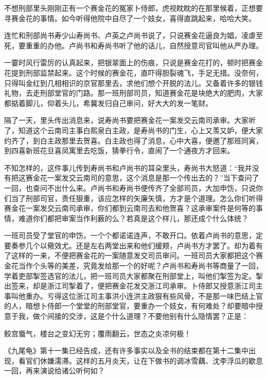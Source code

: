 \documentclass[12pt,UTF8]{ctexbook}
\begin{document}
{{{不想刑部里头刚刚正有一个赛金花的冤家卜侍郎，虎视眈眈的在那里候着，正想要寻赛金花的事情。如今听得他院中自尽了一个妓女，喜得直跳起来，哈哈大笑。

连忙和刑部尚书寿少山寿尚书、卢英之卢尚书说了，只说赛金花逼良为娼，凌虐至死，要重重的办他。卢尚书和寿尚书听了他的话儿，自然授意司官叫他从严办理。

一霎时风行雷厉的认真起来，把银翠面上的伤痕，只说是赛金花打的，顿时把赛金花提到刑部监禁起来。这个时候的赛金花，直吓得胆裂魂飞，手足无措。没奈何，只得叫金红到几相相识的京官那里去，求他们想个开脱的法儿。又备着许多的银钱礼物，去走刑部堂官的门路。那一班刑部司员，知道赛金花是块绝大的肥肉，大家都掂着脚儿，仰着头儿，希冀发归自己审问，好大大的发一笔财。

隔了一天，里头传出消息来，说寿尚书要把赛金花一案发交云南司承审。大家听了，知道这个云南司主事白熙泉白主政，是寿尚书的门生，心上又羡又妒，便大家约齐了，到白主政那里去贺喜。白主政也得了消息，心中大喜，便邀了那班同寅，到四喜新班花旦喜凤寓里去吃饭，猜拳行令，直闹了一个通夜方才回来。

不知怎样的，这件事儿传到寿尚书和卢尚书的耳朵里头，寿尚书大怒道：“我并没有把这赛金花一案发交云南司的意思，这个消息是那一个传出去的？”当下查问了一回，也查问不出什么来。卢尚书和寿尚书便传齐了全部司员，大加申饬，只说你们当了刑部司官，责任狠重，该应怎样的矢廉矢慎，方才是个道理。怎么你们听得赛金花一案发交云南司承审，你们都到云南司去和他贺喜？这承审案件是何等的事情，难道你们都把审案当作利薮的么？若真是这个样儿，那还成个什么体统？

一班司员受了堂官的申饬，一个个都诺诺连声，不敢开口。依着卢尚书的意思，定要奏参几个以儆效尤。还是左右两堂出来和他们缓颊，卢尚书方才罢了。却为着有了这样的一来，不便把赛金花的一案随意发交司员审问。一班司员大家都把这个赛金花当作个头等的美差，究竟发给那一个的好呢？卢尚书和寿尚书等商量了一回，学着吏部掣签选官的法儿，把一班司员大家都聚在刑部堂上，叫他们掣签为定。掣出签来，却是浙江司掣着了，便把赛金花发交浙江司承审。卜侍郎又授意浙江司主事叫他重办。亏得这位浙江司主事洪小连洪主政狠有些风骨，不是那一味巴结上官的人，暗想卜侍郎一个堂堂的刑部堂官，要重办一个妓女，有何难处？却要暗中授意于我，做个间接的交涉，这是个什么道理？不要他别有什么隐情罢？正是：

鲛宫蜃气，楼台之变幻无穷；覆雨翻云，世态之炎凉何极！

《九尾龟》第十一集已经告成，还有许多事实以及全书的结束都在第十二集中出现，看官们休嫌濡滞。这样的五月炎天，让在下做书的调冰雪藕、沈李浮瓜的歇息一回，再来演说给诸公听何如？





}}}
\end{document}
